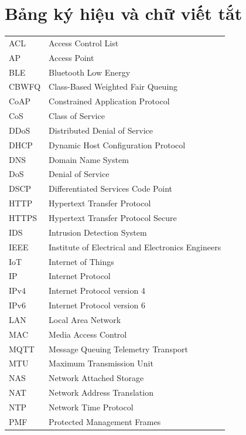 \chapter*{Bảng ký hiệu và chữ viết tắt}

\begin{longtable}{@{\hspace{0.5cm}} l @{\hspace{1.2cm}} p{11.5cm}}
    ACL & Access Control List\\
    AP & Access Point\\
    BLE & Bluetooth Low Energy\\
    CBWFQ & Class-Based Weighted Fair Queuing\\
    CoAP & Constrained Application Protocol\\
    CoS & Class of Service\\
    DDoS & Distributed Denial of Service\\
    DHCP & Dynamic Host Configuration Protocol\\
    DNS & Domain Name System\\
    DoS & Denial of Service\\
    DSCP & Differentiated Services Code Point\\
    HTTP & Hypertext Transfer Protocol\\
    HTTPS & Hypertext Transfer Protocol Secure\\
    IDS & Intrusion Detection System\\
    IEEE & Institute of Electrical and Electronics Engineers\\
    IoT & Internet of Things\\
    IP & Internet Protocol\\
    IPv4 & Internet Protocol version 4\\
    IPv6 & Internet Protocol version 6\\
    LAN & Local Area Network\\
    MAC & Media Access Control\\
    MQTT & Message Queuing Telemetry Transport\\
    MTU & Maximum Transmission Unit\\
    NAS & Network Attached Storage\\
    NAT & Network Address Translation\\
    NTP & Network Time Protocol\\
    PMF & Protected Management Frames\\

\end{longtable}
